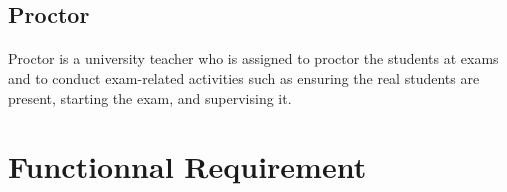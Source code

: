 \documentclass[]{uc2pfecaneva}
\begin{document}
    \raggedright\subsection{Proctor}
    \paragraph{}
    Proctor is a university teacher who is assigned to proctor the students at exams and to conduct exam-related activities such as ensuring the real students are present, starting the exam, and supervising it.

    \raggedright\section{Functionnal Requirement}
\end{document}
